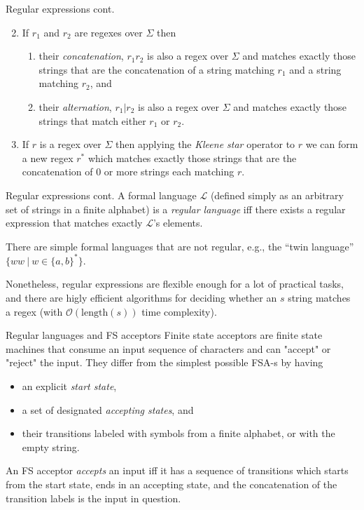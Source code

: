 \documentclass[style=upen, size=14pt]{powerdot}
\newcommand{\gold}{\color{arany}}
\theoremstyle{definition}
\begin{document}
\begin{slide}[toc=]{Regular expressions cont.}
  \begin{enumerate}
     \setcounter{enumi}{1}
  \item If $r_1$ and $r_2$ are regexes over $\Sigma$ then
    \begin{enumerate}
    \item their \emph{\gold concatenation}, $r_1 r_2$ is also a regex over $\Sigma$ and
      matches exactly those strings that are the concatenation of a string
      matching $r_1$ and a string matching $r_2$, and
    \item their \emph{\gold alternation}, $r_1 \vert r_2$ is also a regex over
      $\Sigma$ and matches exactly those strings that match either $r_1$ or
      $r_2$.
    \end{enumerate}
  \item If $r$ is a regex over $\Sigma$ then applying the \emph{\gold Kleene
      star} operator to $r$ we can form a new regex $r^*$ which matches exactly
    those strings that are the concatenation of 0 or more strings each
    matching $r$.
  \end{enumerate}
\end{slide}

\begin{slide}[toc=]{Regular expressions cont.}
  A formal language $\mathcal L$ (defined simply as an arbitrary set of strings
  in a finite alphabet) is a \emph{\gold regular language} iff there exists a
  regular expression that matches exactly $\mathcal L$'s elements.\bigskip

  There are simple formal languages that are not regular, e.g., the ``twin
  language'' $\{ww ~\vert~ w \in \{a, b\}^* \}$.\bigskip

  Nonetheless, regular expressions are flexible enough for a lot of practical
  tasks, and there are higly efficient algorithms for deciding whether an $s$
  string matches a regex (with $\mathcal O(\mathrm{length}(s))$ time
  complexity).
\end{slide}

\begin{slide}[toc=]{Regular languages and FS acceptors}
  Finite state acceptors are finite state machines that consume an input
  sequence of characters and can "accept" or "reject" the input. They differ
  from the simplest possible FSA-s by having
  \begin{itemize}
  \item an explicit \emph{\gold start state},
  \item a set of designated \emph{\gold accepting states}, and
  \item their transitions labeled with symbols from a finite alphabet, or with
    the empty string.
  \end{itemize}
  An FS acceptor \emph{\gold accepts} an input iff it has a sequence of
  transitions which starts from the start state, ends in an accepting state, and
  the concatenation of the transition labels is the input in question.
\end{slide}
\end{document}
